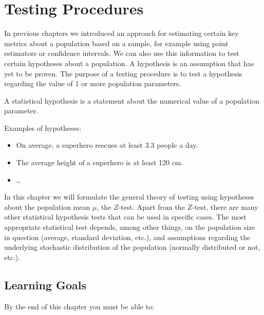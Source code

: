 \chapter{Testing Procedures}
\label{ch:testing-procedures}

In previous chapters we introduced an approach for estimating certain key metrics about a population based on a sample, for example using point estimators or confidence intervals.
We can also use this information to test certain hypotheses about a population. A hypothesis is an assumption that has yet to be proven.
The purpose of a testing procedure is to test a hypothesis regarding the value of 1 or more population parameters.

\begin{definition}
  A statistical hypothesis is a statement about the numerical value of a population parameter.
\end{definition}

Examples of hypotheses:

\begin{itemize}
  \item On average, a superhero rescues at least 3.3 people a day.
  \item The average height of a superhero is at least 120 cm.
  \item \dots
\end{itemize}

In this chapter we will formulate the general theory of testing using hypotheses about the population mean $\mu$, the $Z$-test.
Apart from the $Z$-test, there are many other statistical hypothesis tests that can be used in specific cases.
The most appropriate statistical test depends, among other things, on the population size in question (average, standard deviation, etc.),
and assumptions regarding the underlying stochastic distribution of the population (normally distributed or not, etc.).

\section{Learning Goals}
\label{sec:testing-procedures-learning-goals}

By the end of this chapter you must be able to:

